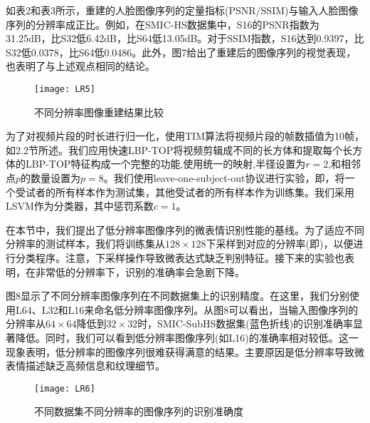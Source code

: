 \begin{table}[!htb]
\centering
\caption{重建图像序列的平均SSIM指标}
\label{tab6}
\end{table}

如表2和表3所示，重建的人脸图像序列的定量指标(PSNR/SSIM)与输入人脸图像序列的分辨率成正比。例如，在SMIC-HS数据集中，S16的PSNR指数为31.25dB，比S32低6.42dB，比S64低13.05dB。对于SSIM指数，S16达到0.9397，比S32低0.0378，比S64低0.0486。此外，图7给出了重建后的图像序列的视觉表现，也表明了与上述观点相同的结论。

\begin{figure}[!htb]
\centering
\texttt{[image: LR5]}
\caption{不同分辨率图像重建结果比较}
\label{fig15}
\end{figure}

为了对视频片段的时长进行归一化，使用TIM算法将视频片段的帧数插值为10帧，如2.2节所述。我们应用快速LBP-TOP将视频剪辑成不同的长方体和提取每个长方体的LBP-TOP特征构成一个完整的功能,使用统一的映射,半径设置为$ r=2 $,和相邻点$p$的数量设置为$ p=8 $。我们使用leave-one-subject-out协议进行实验，即，将一个受试者的所有样本作为测试集，其他受试者的所有样本作为训练集。我们采用LSVM作为分类器，其中惩罚系数$c=1$。

在本节中，我们提出了低分辨率图像序列的微表情识别性能的基线。为了适应不同分辨率的测试样本，我们将训练集从$ 128 \times 128 $下采样到对应的分辨率(即)，以便进行分类程序。注意，下采样操作导致微表达式缺乏判别特征。接下来的实验也表明，在非常低的分辨率下，识别的准确率会急剧下降。

图8显示了不同分辨率图像序列在不同数据集上的识别精度。在这里，我们分别使用L64、L32和L16来命名低分辨率图像序列。从图8可以看出，当输入图像序列的分辨率从$ 64 \times 64 $降低到$ 32 \times 32 $时，SMIC-SubHS数据集(蓝色折线)的识别准确率显著降低。同时，我们可以看到低分辨率图像序列(如L16)的准确率相对较低。这一现象表明，低分辨率的图像序列很难获得满意的结果。主要原因是低分辨率导致微表情描述缺乏高频信息和纹理细节。

\begin{figure}[!htb]
\centering
\texttt{[image: LR6]}
\caption{不同数据集不同分辨率的图像序列的识别准确度}
\label{fig16}
\end{figure}

